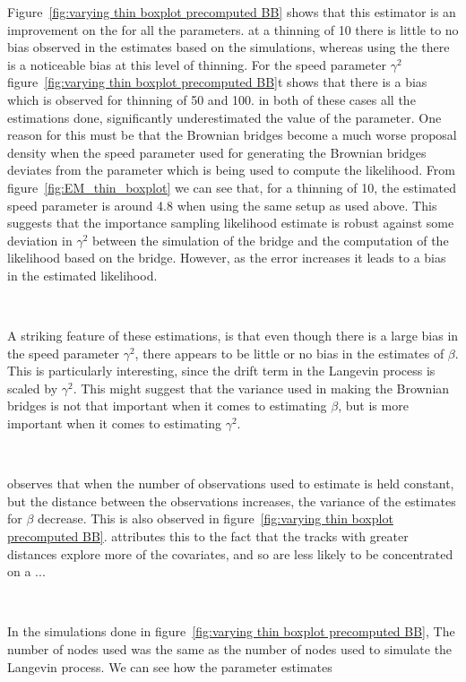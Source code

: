 Figure~\ref{fig:varying thin boxplot precomputed BB} shows that this estimator is an improvement on the \cite{michelot_langevin_2019} for all the parameters. at a thinning of 10 there is little to no bias observed in the estimates based on the simulations, whereas using the \cite{michelot_langevin_2019} there is a noticeable bias at this level of thinning. For the speed parameter $\gamma^2$ figure~\ref{fig:varying thin boxplot precomputed BB}t shows that there is a bias which is observed for thinning of 50 and 100. in both of these cases all the estimations done, significantly underestimated the value of the parameter. One reason for this must be that the Brownian bridges become a much worse proposal density when the speed parameter used for generating the Brownian bridges deviates from the parameter which is being used to compute the likelihood. From figure~\ref{fig:EM_thin_boxplot} we can see that, for a thinning of 10, the estimated speed parameter is around 4.8 when using the same setup as used above. This suggests that the importance sampling likelihood estimate is robust against some deviation in $\gamma^2$ between the simulation of the bridge and the computation of the likelihood based on the bridge. However, as the error increases it leads to a bias in the estimated likelihood.

\

A striking feature of these estimations, is that even though there is a large bias in the speed parameter $\gamma^2$, there appears to be little or no bias in the estimates of $\beta$. This is particularly interesting, since the drift term in the Langevin process is scaled by $\gamma^2$. This might suggest that the variance used in making the Brownian bridges is not that important when it comes to estimating $\beta$, but is more important when it comes to estimating $\gamma^2$.

\ 

\cite{michelot_langevin_2019} observes that when the number of observations used to estimate is held constant, but the distance between the observations increases, the variance of the estimates for $\beta$ decrease. This is also observed in figure~\ref{fig:varying thin boxplot precomputed BB}. \cite{michelot_langevin_2019} attributes this to the fact that the tracks with greater distances explore more of the covariates, and so are less likely to be concentrated on a ...


\

In the simulations done in figure~\ref{fig:varying thin boxplot precomputed BB}, The number of nodes used was the same as the number of nodes used to simulate the Langevin process. We can see how the parameter estimates 



